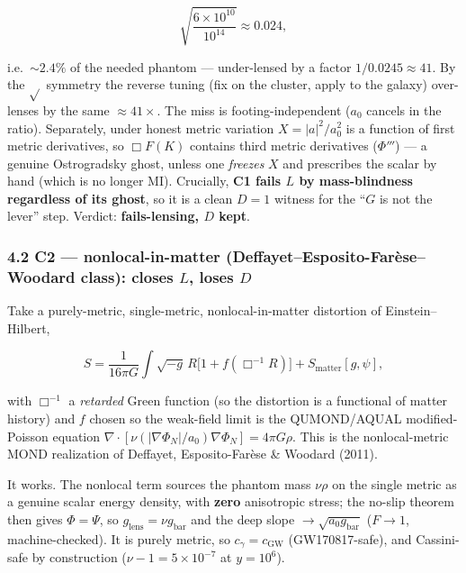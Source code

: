 \documentclass[
]{article}
\begin{document}
\[
\sqrt{\frac{6\times10^{10}}{10^{14}}} \approx 0.024,
\]

i.e.~\(\sim 2.4\%\) of the needed phantom --- under-lensed by a factor
\(1/0.0245\approx 41\). By the \(\sqrt{}\) symmetry the reverse tuning
(fix on the cluster, apply to the galaxy) over-lenses by the same
\(\approx41\times\). The miss is footing-independent (\(a_0\) cancels in
the ratio). Separately, under honest metric variation \(X=|a|^2/a_0^2\)
is a function of first metric derivatives, so \(\Box F(K)\) contains
third metric derivatives (\(\Phi'''\)) --- a genuine Ostrogradsky ghost,
unless one \emph{freezes} \(X\) and prescribes the scalar by hand (which
is no longer MI). Crucially, \textbf{C1 fails \(L\) by mass-blindness
regardless of its ghost}, so it is a clean \(D=1\) witness for the
``\(G\) is not the lever'' step. Verdict: \textbf{fails-lensing, \(D\)
kept}.

\subsubsection{\texorpdfstring{4.2 C2 --- nonlocal-in-matter
(Deffayet--Esposito-Farèse--Woodard class): closes \(L\), loses
\(D\)}{4.2 C2 --- nonlocal-in-matter (Deffayet--Esposito-Farèse--Woodard class): closes L, loses D}}\label{c2-nonlocal-in-matter-deffayetesposito-faruxe8sewoodard-class-closes-l-loses-d}

Take a purely-metric, single-metric, nonlocal-in-matter distortion of
Einstein--Hilbert,

\[
S = \frac{1}{16\pi G}\int\sqrt{-g}\,R\big[1+f(\Box^{-1}R)\big] + S_\mathrm{matter}[g,\psi],
\]

with \(\Box^{-1}\) a \emph{retarded} Green function (so the distortion
is a functional of matter history) and \(f\) chosen so the weak-field
limit is the QUMOND/AQUAL modified-Poisson equation
\(\nabla\cdot[\nu(|\nabla\Phi_N|/a_0)\nabla\Phi_N]=4\pi G\rho\). This is
the nonlocal-metric MOND realization of Deffayet, Esposito-Farèse \&
Woodard (2011).

It works. The nonlocal term sources the phantom mass \(\nu\rho\) on the
single metric as a genuine scalar energy density, with \textbf{zero}
anisotropic stress; the no-slip theorem then gives \(\Phi=\Psi\), so
\(g_\mathrm{lens}=\nu g_\mathrm{bar}\) and the deep slope
\(\to\sqrt{a_0 g_\mathrm{bar}}\) (\(F\to1\), machine-checked). It is purely
metric, so \(c_\gamma=c_\mathrm{GW}\) (GW170817-safe), and Cassini-safe by
construction (\(\nu-1=5\times10^{-7}\) at \(y=10^6\)).
\end{document}
